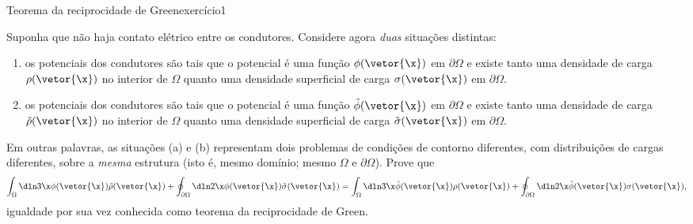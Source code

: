 \begin{exercício}{Teorema da reciprocidade de Green}{exercício1}
\begin{center}
    \end{center}
    Suponha que não haja contato elétrico entre os condutores. Considere agora \emph{duas} situações distintas:
    \begin{enumerate}[label=(\alph*)]
        \item os potenciais dos condutores são tais que o potencial é uma função \(\phi(\vetor{\x})\) em \(\partial \Omega\) e existe tanto uma densidade de carga \(\rho(\vetor{\x})\) no interior de \(\Omega\) quanto uma densidade superficial de carga \(\sigma(\vetor{\x})\) em \(\partial \Omega\).
        \item os potenciais dos condutores são tais que o potencial é uma função \(\tilde{\phi}(\vetor{\x})\) em \(\partial \Omega\) e existe tanto uma densidade de carga \(\tilde{\rho}(\vetor{\x})\) no interior de \(\Omega\) quanto uma densidade superficial de carga \(\tilde{\sigma}(\vetor{\x})\) em \(\partial \Omega\).
    \end{enumerate}
    Em outras palavras, as situações (a) e (b) representam dois problemas de condições de contorno diferentes, com distribuições de cargas diferentes, sobre a \emph{mesma} estrutura (isto é, mesmo domínio; mesmo \(\Omega\) e \(\partial \Omega\)). Prove que
    \begin{equation*}
        \int_{\Omega}\dln3\x \phi(\vetor{\x}) \tilde{\rho}(\vetor{\x}) + \oint_{\partial \Omega}\dln2\x \phi(\vetor{\x})\tilde{\sigma}(\vetor{\x}) = \int_{\Omega}\dln3\x \tilde{\phi}(\vetor{\x})\rho(\vetor{\x}) + \oint_{\partial \Omega} \dln2\x \tilde{\phi}(\vetor{\x})\sigma(\vetor{\x}),
    \end{equation*}
    igualdade por sua vez conhecida como teorema da reciprocidade de Green.
\end{exercício}
